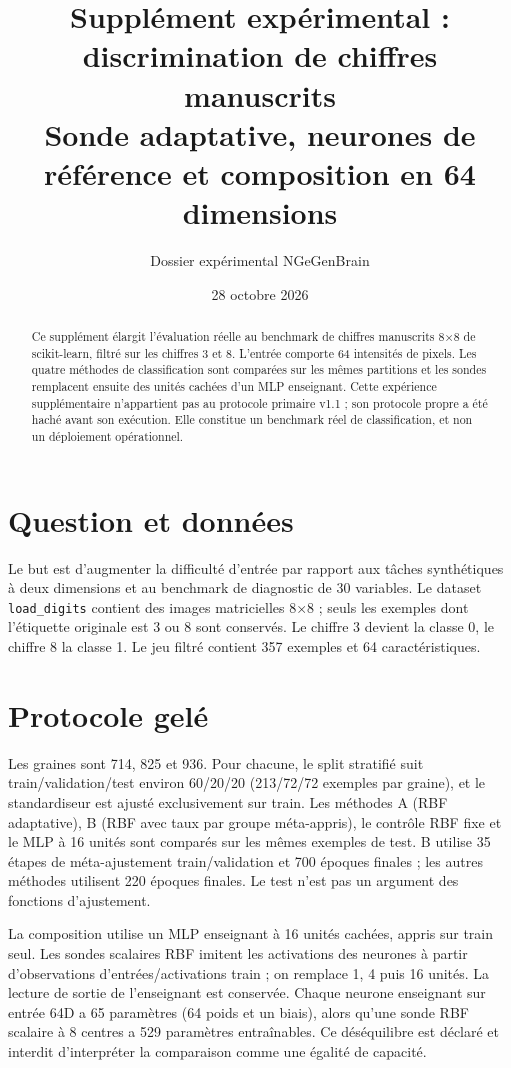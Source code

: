 \documentclass[11pt,a4paper]{article}
\title{\textcolor{blueNG}{Supplément expérimental : discrimination de chiffres manuscrits}\\[.25em]\large Sonde adaptative, neurones de référence et composition en 64 dimensions}
\author{Dossier expérimental NGeGenBrain}
\date{28 octobre 2026}
\begin{document}
\maketitle
\begin{abstract}
Ce supplément élargit l'évaluation réelle au benchmark de chiffres manuscrits 8×8 de scikit-learn, filtré sur les chiffres 3 et 8. L'entrée comporte 64 intensités de pixels. Les quatre méthodes de classification sont comparées sur les mêmes partitions et les sondes remplacent ensuite des unités cachées d'un MLP enseignant. Cette expérience supplémentaire n'appartient pas au protocole primaire v1.1 ; son protocole propre a été haché avant son exécution. Elle constitue un benchmark réel de classification, et non un déploiement opérationnel.
\end{abstract}

\section{Question et données}
Le but est d'augmenter la difficulté d'entrée par rapport aux tâches synthétiques à deux dimensions et au benchmark de diagnostic de 30 variables. Le dataset \texttt{load\_digits} contient des images matricielles 8×8 ; seuls les exemples dont l'étiquette originale est 3 ou 8 sont conservés. Le chiffre 3 devient la classe 0, le chiffre 8 la classe 1. Le jeu filtré contient 357 exemples et 64 caractéristiques.

\section{Protocole gelé}
Les graines sont 714, 825 et 936. Pour chacune, le split stratifié suit train/validation/test environ 60/20/20 (213/72/72 exemples par graine), et le standardiseur est ajusté exclusivement sur train. Les méthodes A (RBF adaptative), B (RBF avec taux par groupe méta-appris), le contrôle RBF fixe et le MLP à 16 unités sont comparés sur les mêmes exemples de test. B utilise 35 étapes de méta-ajustement train/validation et 700 époques finales ; les autres méthodes utilisent 220 époques finales. Le test n'est pas un argument des fonctions d'ajustement.

La composition utilise un MLP enseignant à 16 unités cachées, appris sur train seul. Les sondes scalaires RBF imitent les activations des neurones à partir d'observations d'entrées/activations train ; on remplace 1, 4 puis 16 unités. La lecture de sortie de l'enseignant est conservée. Chaque neurone enseignant sur entrée 64D a 65 paramètres (64 poids et un biais), alors qu'une sonde RBF scalaire à 8 centres a 529 paramètres entraînables. Ce déséquilibre est déclaré et interdit d'interpréter la comparaison comme une égalité de capacité.
\end{document}
